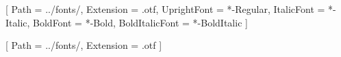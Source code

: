 \usepackage{fontspec}

\setmainfont{STIX2Text}[
Path = ../fonts/,
Extension       = .otf,
UprightFont     = *-Regular,
ItalicFont      = *-Italic,
BoldFont        = *-Bold,
BoldItalicFont  = *-BoldItalic ]

\usepackage[math-style=ISO]{unicode-math}
[
Path = ../fonts/,
Extension = .otf
]

\setsansfont[Scale=MatchLowercase]{TeX Gyre Heros}

\setmonofont{Input Mono}

\usepackage[tracking=false]{microtype}
